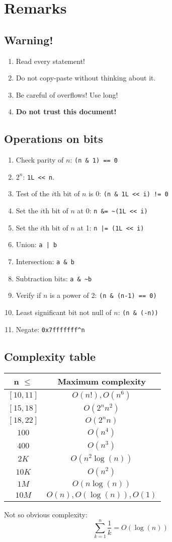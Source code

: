 \section{Remarks}
\subsection{Warning!}
\begin{enumerate}
	\item Read every statement!
	\item Do not copy-paste without thinking about it.
	\item Be careful of overflows! Use long!
	\item \textbf{Do not trust this document!}
\end{enumerate}
 
\subsection{Operations on bits}
\begin{enumerate}
	\item Check parity of $n$: \lstinline{(n & 1) == 0}
	\item $2^n$: \lstinline|1L << n|.
	\item Test of the $i$th bit of $n$ is $0$: \lstinline{(n & 1L << i) != 0}
	\item Set the $i$th bit of $n$ at 0: \lstinline{n &= ~(1L << i)}
	\item Set the $i$th bit of $n$ at 1: \lstinline{n |= (1L << i)}
	\item Union: \lstinline{a | b}
	\item Intersection: \lstinline{a & b}
	\item Subtraction bits: \lstinline{a & ~b}
	\item Verify if $n$ is a power of 2: \lstinline{(n & (n-1) == 0)}
	\item Least significant bit not null of $n$: \lstinline{(n & (-n))}
	\item Negate: \lstinline{0x7fffffff^n}
\end{enumerate}

\subsection{Complexity table}
\begin{center}
\begin{tabular}{|c|c|}
\hline
n $\leq$ & Maximum complexity\\
\hline
$[10,11]$ & $O(n!),O(n^6)$ \\
$[15,18]$ & $O(2^n n^2)$\\
$[18,22]$ & $O(2^n n)$\\
$100$ & $O(n^4)$\\
$400$ & $O(n^3)$\\
$2K$ & $O(n^2\log(n))$\\
$10K$ & $O(n^2)$\\
$1M$ & $O(n\log(n))$\\
$10M$ & $O(n),O(\log(n)),O(1)$\\
\hline
\end{tabular}
\end{center}
Not so obvious complexity:
$$\sum_{k=1}^n \frac{1}{k} = O(\log(n))$$
